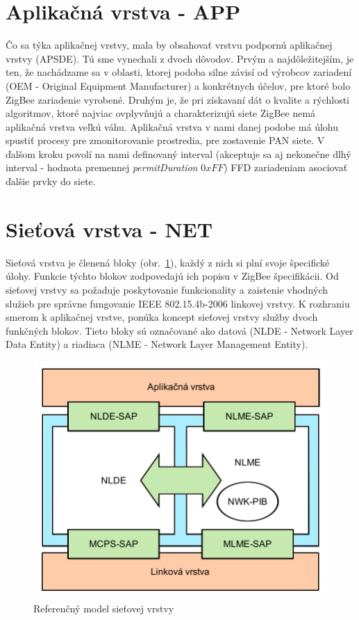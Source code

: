 \section{Aplikačná vrstva - APP}
\indent\indent Čo sa týka aplikačnej vrstvy, mala by obsahovať vrstvu podpornú aplikačnej vrstvy (APSDE). Tú sme vynechali z dvoch dôvodov. Prvým a najdôležitejším, je ten, že nachádzame sa v oblasti, ktorej podoba silne závisí od výrobcov zariadení (OEM - Original Equipment Manufacturer) a konkrétnych účelov, pre ktoré bolo ZigBee zariadenie vyrobené. Druhým je, že pri získavaní dát o kvalite a rýchlosti algoritmov, ktoré najviac ovplyvňujú a charakterizujú siete ZigBee nemá aplikačná vrstva veľkú váhu. Aplikačná vrstva v nami danej podobe má úlohu spustiť procesy pre zmonitorovanie prostredia, pre zostavenie PAN siete. V ďalšom kroku povolí na nami definovaný interval (akceptuje sa aj nekonečne dlhý interval - hodnota premennej \textit{permitDuration} $0xFF$) FFD zariadeniam asociovať ďalšie prvky do siete.\\

\section{Sieťová vrstva - NET}
\indent\indent Sieťová vrstva je členená bloky (obr.~\ref{fig:topology_net}), každý z nich si plní svoje špecifické úlohy. Funkcie týchto blokov zodpovedajú ich popisu v ZigBee špecifikácii. Od sieťovej vrstvy sa požaduje poskytovanie funkcionality a zaistenie vhodných služieb pre správne fungovanie IEEE 802.15.4b-2006 linkovej vrstvy. K rozhraniu smerom k aplikačnej vrstve, ponúka koncept sieťovej vrstvy služby dvoch funkčných blokov. Tieto bloky sú označované ako datová (NLDE - Network Layer Data Entity) a riadiaca (NLME - Network Layer Management Entity).\\
\begin{figure}[htbp]
\begin{center}
\includegraphics[width=120mm]{figures/topology_net}
\caption{Referenčný model sieťovej vrstvy}
\label{fig:topology_net}
\end{center}
\end{figure}
